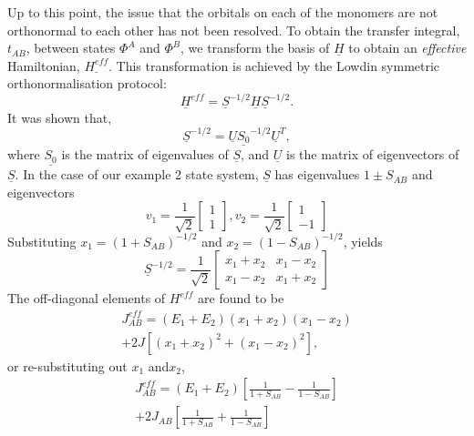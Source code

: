 \documentclass[aps,physrev,reprint,superscriptaddress,nofootinbib,amsmath,amssymb,a4paper]{revtex4-2}
\begin{document}
Up to this point, the issue that the orbitals on each of the monomers are not orthonormal to each other has not been resolved. To obtain the transfer integral, $t_{AB}$, between states $\Phi^A$ and $\Phi^B$, we transform the basis of $\underline{H}$ to obtain an \textit{effective} Hamiltonian, $\underline{H^{eff}}$. This transformation is achieved by the Lowdin symmetric orthonormalisation protocol:
\begin{equation}
    \underline{H}^{eff} = \underline{S}^{-1/2}\underline{H}\underline{S}^{-1/2}.
\end{equation}
It was shown that,
\begin{equation}
    \underline{S}^{-1/2} = \underline{U} \underline{S_0}^{-1/2}\underline{U}^T,
\end{equation}
where $\underline{S_0}$ is the matrix of eigenvalues of $\underline{S}$, and $\underline{U}$ is the matrix of eigenvectors of $\underline{S}$. In the case of our example 2 state system, $\underline{S}$ has eigenvalues $1\pm S_{AB}$ and eigenvectors
\begin{equation}
    v_1 = \frac{1}{\sqrt{2}}
    \begin{bmatrix}
    1\\1
    \end{bmatrix}
    ,  v_2 = \frac{1}{\sqrt{2}}
    \begin{bmatrix}
    1\\-1    
    \end{bmatrix}
\end{equation}
Substituting $x_1 = (1+S_{AB})^{-1/2}$ and $x_2 = (1-S_{AB})^{-1/2}$, yields
\begin{equation}
    \underline{S}^{-1/2} = \frac{1}{\sqrt{2}}\begin{bmatrix}
        x_1+x_2 &x_1-x_2\\
        x_1-x_2 & x_1+x_2
    \end{bmatrix} 
\end{equation}
The off-diagonal elements of $H^{eff}$ are found to be 
\begin{multline}
    J^{eff}_{AB} = (E_1+E_2)(x_1+x_2)(x_1-x_2) \\ + 2J[(x_1+x_2)^2+(x_1-x_2)^2], 
\end{multline}
or re-substituting out $x_1$ and$x_2$,
\begin{multline}
    J^{eff}_{AB} = (E_1+E_2)\left[\frac{1}{1+S_{AB}}-\frac{1}{1-S_{AB}}\right]\\
    + 2J_{AB}\left[\frac{1}{1+S_{AB}}+\frac{1}{1-S_{AB}}\right]
\end{multline}
\end{document}
